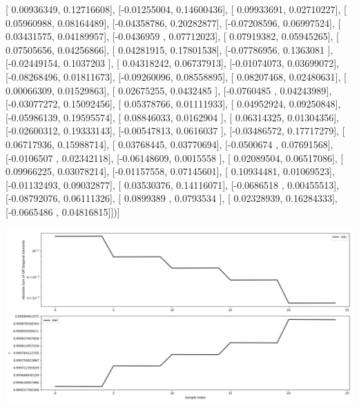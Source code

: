 \documentclass{article}
\begin{document}
       [ 0.00936349,  0.12716608],
       [-0.01255004,  0.14600436],
       [ 0.09933691,  0.02710227],
       [ 0.05960988,  0.08164489],
       [-0.04358786,  0.20282877],
       [-0.07208596,  0.06997524],
       [ 0.03431575,  0.04189957],
       [-0.0436959 ,  0.07712023],
       [ 0.07919382,  0.05945265],
       [ 0.07505656,  0.04256866],
       [ 0.04281915,  0.17801538],
       [-0.07786956,  0.1363081 ],
       [-0.02449154,  0.1037203 ],
       [ 0.04318242,  0.06737913],
       [-0.01074073,  0.03699072],
       [-0.08268496,  0.01811673],
       [-0.09260096,  0.08558895],
       [ 0.08207468,  0.02480631],
       [ 0.00066309,  0.01529863],
       [ 0.02675255,  0.0432485 ],
       [-0.0760485 ,  0.04243989],
       [-0.03077272,  0.15092456],
       [ 0.05378766,  0.01111933],
       [ 0.04952924,  0.09250848],
       [-0.05986139,  0.19595574],
       [ 0.08846033,  0.0162904 ],
       [ 0.06314325,  0.01304356],
       [-0.02600312,  0.19333143],
       [-0.00547813,  0.0616037 ],
       [-0.03486572,  0.17717279],
       [ 0.06717936,  0.15988714],
       [ 0.03768445,  0.03770694],
       [-0.0500674 ,  0.07691568],
       [-0.0106507 ,  0.02342118],
       [-0.06148609,  0.0015558 ],
       [ 0.02089504,  0.06517086],
       [ 0.09966225,  0.03078214],
       [-0.01157558,  0.07145601],
       [ 0.10934481,  0.01069523],
       [-0.01132493,  0.09032877],
       [ 0.03530376,  0.14116071],
       [-0.0686518 ,  0.00455513],
       [-0.08792076,  0.06111326],
       [ 0.0899389 ,  0.0793534 ],
       [ 0.02328939,  0.16284333],
       [-0.0665486 ,  0.04816815]])]
\begin{center}
\includegraphics[scale=.9]{report_pickled_controls193/control_dpn_all.png}

\end{center}
\end{document}
